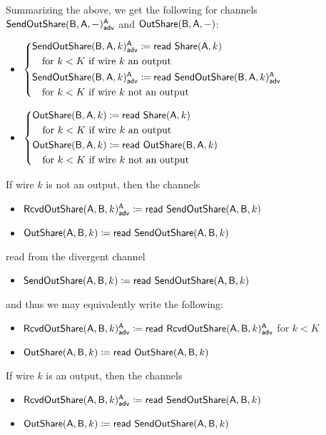 Summarizing the above, we get the following for channels $\mathsf{SendOutShare}(\mathsf{B},\mathsf{A},-)^{\mathsf{A}}_{\mathsf{adv}}$ and $\mathsf{OutShare}(\mathsf{B},\mathsf{A},-)$:
\begin{itemize}
\item {\color{blue} $\begin{cases*} \LeakSendOutShare(\B,\A,k)^\A_\adv \coloneqq \read{\Share(\A,k)} \\ \hspace{10pt} \text{for $k < K$ if wire $k$ an output} \\ \LeakSendOutShare(\B,\A,k)^\A_\adv \coloneqq \read{\LeakSendOutShare(\B,\A,k)^\A_\adv} \\ \hspace{10pt} \text{for $k < K$ if wire $k$ not an output} \end{cases*}$}
\item $\begin{cases*} \OutShare(\B,\A,k) \coloneqq \read{\Share(\A,k)} \\ \hspace{10pt} \text{for $k < K$ if wire $k$ an output} \\ \OutShare(\B,\A,k) \coloneqq \read{\OutShare(\B,\A,k)} \\ \hspace{10pt} \text{for $k < K$ if wire $k$ not an output} \end{cases*}$
\end{itemize}
If wire $k$ is not an output, then the channels
\begin{itemize}
\item {\color{blue} $\mathsf{RcvdOutShare}(\mathsf{A},\mathsf{B},k)^{\mathsf{A}}_{\mathsf{adv}} \coloneqq \mathsf{read} \ \mathsf{SendOutShare}(\mathsf{A},\mathsf{B},k)$}
\item $\mathsf{OutShare}(\mathsf{A},\mathsf{B},k) \coloneqq \mathsf{read} \ \mathsf{SendOutShare}(\mathsf{A},\mathsf{B},k)$
\end{itemize}
read from the divergent channel
\begin{itemize}
\item $\mathsf{SendOutShare}(\mathsf{A},\mathsf{B},k) \coloneqq \mathsf{read} \ \mathsf{SendOutShare}(\mathsf{A},\mathsf{B},k)$
\end{itemize}
and thus we may equivalently write the following:
\begin{itemize}
\item {\color{blue} $\mathsf{RcvdOutShare}(\mathsf{A},\mathsf{B},k)^{\mathsf{A}}_{\mathsf{adv}} \coloneqq \mathsf{read} \ \mathsf{RcvdOutShare}(\mathsf{A},\mathsf{B},k)^{\mathsf{A}}_{\mathsf{adv}}$ for $k < K$}
\item $\mathsf{OutShare}(\mathsf{A},\mathsf{B},k) \coloneqq \mathsf{read} \ \mathsf{OutShare}(\mathsf{A},\mathsf{B},k)$
\end{itemize}
If wire $k$ is an output, then the channels
\begin{itemize}
\item {\color{blue} $\mathsf{RcvdOutShare}(\mathsf{A},\mathsf{B},k)^{\mathsf{A}}_{\mathsf{adv}} \coloneqq \mathsf{read} \ \mathsf{SendOutShare}(\mathsf{A},\mathsf{B},k)$}
\item $\mathsf{OutShare}(\mathsf{A},\mathsf{B},k) \coloneqq \mathsf{read} \ \mathsf{SendOutShare}(\mathsf{A},\mathsf{B},k)$
\end{itemize}
